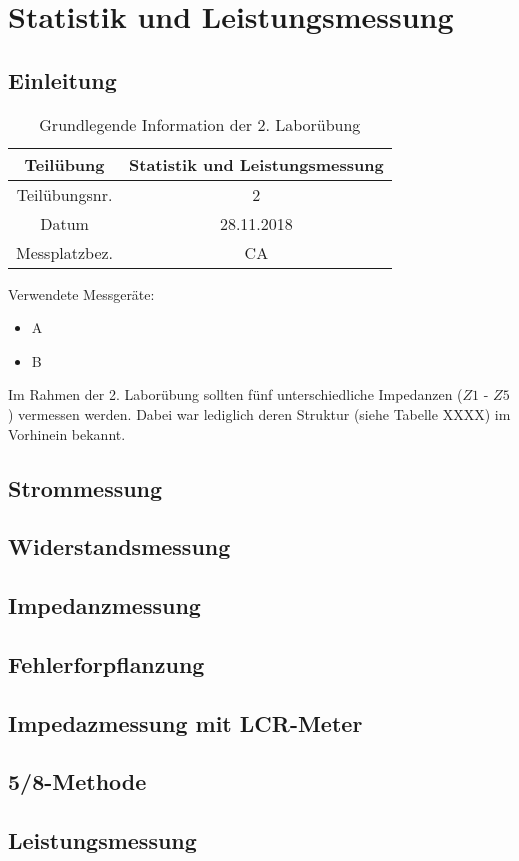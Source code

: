 \chapter{Statistik und Leistungsmessung}
\section{Einleitung}
\begin{table}[]
	\centering
	\begin{tabular}{|c|c|}
		\hline 
		Teilübung 	& Statistik und Leistungsmessung \\
		\hline 
		Teilübungsnr. 		& 2	 \\ 
		\hline 
		Datum 		& 28.11.2018 \\ 
		\hline 
		Messplatzbez. 	& CA \\
		\hline
	\end{tabular} 
	\caption{Grundlegende Information der 2. Laborübung}
\end{table}

Verwendete Messgeräte:
\begin{itemize}
	\item{A}
	\item{B}
\end{itemize}

Im Rahmen der 2. Laborübung sollten fünf unterschiedliche Impedanzen ($Z1$ - $Z5$) vermessen werden. Dabei war lediglich deren Struktur (siehe Tabelle XXXX) im Vorhinein bekannt.

\section{Strommessung}

\section{Widerstandsmessung}

\section{Impedanzmessung}

\section{Fehlerforpflanzung}

\section{Impedazmessung mit LCR-Meter}

\section{5/8-Methode}

\section{Leistungsmessung}